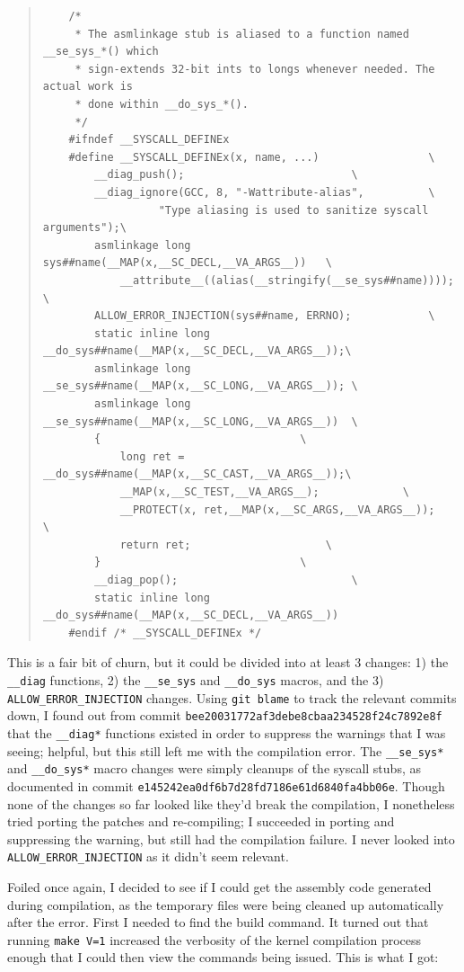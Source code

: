 \documentclass{article}
\begin{document}
\begin{quote}
\begin{verbatim}
	/*
	 * The asmlinkage stub is aliased to a function named __se_sys_*() which
	 * sign-extends 32-bit ints to longs whenever needed. The actual work is
	 * done within __do_sys_*().
	 */
	#ifndef __SYSCALL_DEFINEx
	#define __SYSCALL_DEFINEx(x, name, ...)					\
		__diag_push();							\
		__diag_ignore(GCC, 8, "-Wattribute-alias",			\
			      "Type aliasing is used to sanitize syscall arguments");\
		asmlinkage long sys##name(__MAP(x,__SC_DECL,__VA_ARGS__))	\
			__attribute__((alias(__stringify(__se_sys##name))));	\
		ALLOW_ERROR_INJECTION(sys##name, ERRNO);			\
		static inline long __do_sys##name(__MAP(x,__SC_DECL,__VA_ARGS__));\
		asmlinkage long __se_sys##name(__MAP(x,__SC_LONG,__VA_ARGS__));	\
		asmlinkage long __se_sys##name(__MAP(x,__SC_LONG,__VA_ARGS__))	\
		{								\
			long ret = __do_sys##name(__MAP(x,__SC_CAST,__VA_ARGS__));\
			__MAP(x,__SC_TEST,__VA_ARGS__);				\
			__PROTECT(x, ret,__MAP(x,__SC_ARGS,__VA_ARGS__));	\
			return ret;						\
		}								\
		__diag_pop();							\
		static inline long __do_sys##name(__MAP(x,__SC_DECL,__VA_ARGS__))
	#endif /* __SYSCALL_DEFINEx */
\end{verbatim}
\end{quote}

This is a fair bit of churn, but it could be divided into at least 3 changes: 1) the \texttt{__diag} functions, 2) the \texttt{__se_sys} and \texttt{__do_sys} macros, and the 3) \texttt{ALLOW_ERROR_INJECTION} changes.  Using \texttt{git blame} to track the relevant commits down, I found out from commit \texttt{bee20031772af3debe8cbaa234528f24c7892e8f} that the \texttt{__diag*} functions existed in order to suppress the warnings that I was seeing; helpful, but this still left me with the compilation error.  The \texttt{__se_sys*} and \texttt{__do_sys*} macro changes were simply cleanups of the syscall stubs, as documented in commit \texttt{e145242ea0df6b7d28fd7186e61d6840fa4bb06e}.  Though none of the changes so far looked like they'd break the compilation, I nonetheless tried porting the patches and re-compiling; I succeeded in porting and suppressing the warning, but still had the compilation failure.  I never looked into \texttt{ALLOW_ERROR_INJECTION} as it didn't seem relevant.

Foiled once again, I decided to see if I could get the assembly code generated during compilation, as the temporary files were being cleaned up automatically after the error.  First I needed to find the build command.  It turned out that running \texttt{make V=1} increased the verbosity of the kernel compilation process enough that I could then view the commands being issued.  This is what I got:
\end{document}
